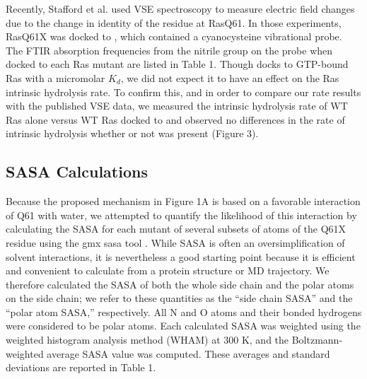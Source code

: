 Recently, Stafford et al. used VSE spectroscopy to measure electric field changes due to the change in identity of the residue at RasQ61\cite{Stafford2012}. 
In those experiments, RasQ61X was docked to \RalBSCN{}, which contained a cyanocysteine vibrational probe. 
The FTIR absorption frequencies from the nitrile group on the probe when docked to each Ras mutant are listed in Table 1. 
Though \RalB{} docks to GTP-bound Ras with a micromolar $K_d$, we did not expect it to have an effect on the Ras intrinsic hydrolysis rate. 
To confirm this, and in order to compare our rate results with the published VSE data, we measured the intrinsic hydrolysis rate of WT Ras alone versus WT Ras docked to \RalBSCN{} and observed no differences in the rate of intrinsic hydrolysis whether or not \RalBSCN{} was present (Figure 3).

\subsection{SASA Calculations}

Because the proposed mechanism in Figure 1A is based on a favorable interaction of Q61 with water, we attempted to quantify the likelihood of this interaction by calculating the SASA for each mutant of several subsets of atoms of the Q61X residue using the gmx sasa tool \cite{Eisenhaber1995}.
While SASA is often an oversimplification of solvent interactions, it is nevertheless a good starting point because it is efficient and convenient to calculate from a protein structure or MD trajectory. 
We therefore calculated the SASA of both the whole side chain and the polar atoms on the side chain; we refer to these quantities as the ``side chain SASA'' and the ``polar atom SASA,'' respectively. 
All N and O atoms and their bonded hydrogens were considered to be polar atoms. 
Each calculated SASA was weighted using the weighted histogram analysis method (WHAM) at 300 K, and the Boltzmann-weighted average SASA value was computed. 
These averages and standard deviations are reported in Table 1.

